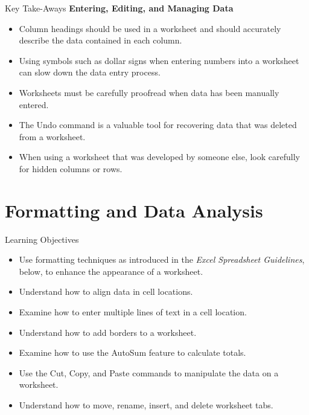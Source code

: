 \begin{center}
	\begin{tkwbox}{Key Take-Aways}
		\textbf{Entering, Editing, and Managing Data}
		\\
		\begin{itemize}
			\setlength{\itemsep}{0pt}
			\setlength{\parskip}{0pt}
			\setlength{\parsep}{0pt}
			
			\item Column headings should be used in a worksheet and should accurately describe the data contained in each column.
			\item Using symbols such as dollar signs when entering numbers into a worksheet can slow down the data entry process.
			\item Worksheets must be carefully proofread when data has been manually entered.
			\item The Undo command is a valuable tool for recovering data that was deleted from a worksheet.
			\item When using a worksheet that was developed by someone else, look carefully for hidden columns or rows.
			
		\end{itemize}
	\end{tkwbox}
\end{center}

\section{Formatting and Data Analysis}

\begin{center}
	\begin{objbox}{Learning Objectives}
		\begin{itemize}
			\setlength{\itemsep}{0pt}
			\setlength{\parskip}{0pt}
			\setlength{\parsep}{0pt}
			
			\item Use formatting techniques as introduced in the \textit{Excel Spreadsheet Guidelines}, below, to enhance the appearance of a worksheet.
			\item Understand how to align data in cell locations.
			\item Examine how to enter multiple lines of text in a cell location.
			\item Understand how to add borders to a worksheet.
			\item Examine how to use the AutoSum feature to calculate totals.
			\item Use the Cut, Copy, and Paste commands to manipulate the data on a worksheet.
			\item Understand how to move, rename, insert, and delete worksheet tabs.
		\end{itemize}
	\end{objbox}
\end{center}

